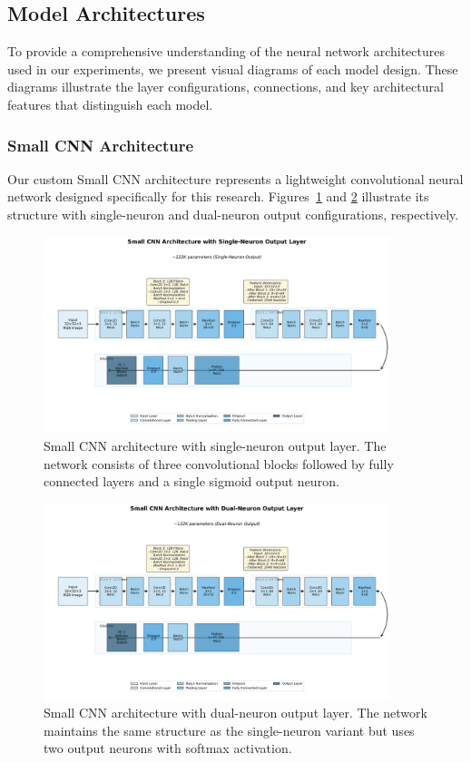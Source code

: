\subsection{Model Architectures}

To provide a comprehensive understanding of the neural network architectures used in our experiments, we present visual diagrams of each model design. These diagrams illustrate the layer configurations, connections, and key architectural features that distinguish each model.

\subsubsection{Small CNN Architecture}

Our custom Small CNN architecture represents a lightweight convolutional neural network designed specifically for this research. Figures~\ref{fig:small_cnn_arch_single} and \ref{fig:small_cnn_arch_dual} illustrate its structure with single-neuron and dual-neuron output configurations, respectively.

\begin{figure}[!htbp]
\centering
\includegraphics[width=0.9\textwidth]{figures/small_cnn_1neuron_architecture.png}
\caption{Small CNN architecture with single-neuron output layer. The network consists of three convolutional blocks followed by fully connected layers and a single sigmoid output neuron.}
\label{fig:small_cnn_arch_single}
\end{figure}

\begin{figure}[!htbp]
\centering
\includegraphics[width=0.9\textwidth]{figures/small_cnn_2neuron_architecture.png}
\caption{Small CNN architecture with dual-neuron output layer. The network maintains the same structure as the single-neuron variant but uses two output neurons with softmax activation.}
\label{fig:small_cnn_arch_dual}
\end{figure}

